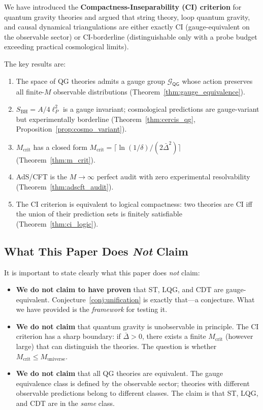 \documentclass[12pt,a4paper]{article}
\theoremstyle{remark}
\newcommand{\G}{\mathcal{G}}
\newcommand{\CI}{\textsf{CI}}
\newcommand{\QG}{\textsf{QG}}
\begin{document}
We have introduced the \textbf{Compactness-Inseparability (CI) criterion} for quantum gravity theories and argued that string theory, loop quantum gravity, and causal dynamical triangulations are either exactly \CI{} (gauge-equivalent on the observable sector) or \CI{}-borderline (distinguishable only with a probe budget exceeding practical cosmological limits).

The key results are:
\begin{enumerate}[leftmargin=*, label=(\arabic*)]
  \item The space of QG theories admits a gauge group $\G_{\QG}$ whose action preserves all finite-$M$ observable distributions (Theorem~\ref{thm:gauge_equivalence}).
  \item $S_{\text{BH}} = A/4\ell_P^2$ is a gauge invariant; cosmological predictions are gauge-variant but experimentally borderline (Theorem~\ref{thm:cercis_qg}, Proposition~\ref{prop:cosmo_variant}).
  \item $M_{\text{crit}}$ has a closed form $M_{\text{crit}} = \lceil \ln(1/\delta) / (2\bar{\Delta}^2) \rceil$ (Theorem~\ref{thm:m_crit}).
  \item AdS/CFT is the $M \to \infty$ perfect audit with zero experimental resolvability (Theorem~\ref{thm:adscft_audit}).
  \item The \CI{} criterion is equivalent to logical compactness: two theories are \CI{} iff the union of their prediction sets is finitely satisfiable (Theorem~\ref{thm:ci_logic}).
\end{enumerate}

\subsection{What This Paper Does \emph{Not} Claim}

It is important to state clearly what this paper does \emph{not} claim:

\begin{itemize}[leftmargin=*]
  \item \textbf{We do not claim to have proven} that ST, LQG, and CDT are gauge-equivalent. Conjecture~\ref{conj:unification} is exactly that---a conjecture. What we have provided is the \emph{framework} for testing it.
  \item \textbf{We do not claim} that quantum gravity is unobservable in principle. The \CI{} criterion has a sharp boundary: if $\bar{\Delta} > 0$, there exists a finite $M_{\text{crit}}$ (however large) that can distinguish the theories. The question is whether $M_{\text{crit}} \leq M_{\text{universe}}$.
  \item \textbf{We do not claim} that all QG theories are equivalent. The gauge equivalence class is defined by the observable sector; theories with different observable predictions belong to different classes. The claim is that ST, LQG, and CDT are in the \emph{same} class.
\end{itemize}
\end{document}
